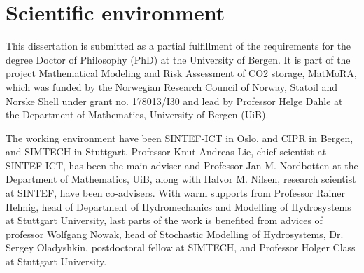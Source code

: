 \chapter{Scientific environment}

This dissertation is submitted as a partial fulfillment of the requirements for
the degree Doctor of Philosophy (PhD) at the University of Bergen. It is part
of the project Mathematical Modeling and Risk Assessment of CO2 storage,
MatMoRA, which was funded by the Norwegian Research Council of Norway, Statoil and Norske
Shell under grant no. 178013/I30 and lead by Professor Helge Dahle at the
Department of Mathematics, University of Bergen (UiB). 

The working environment have been SINTEF-ICT in Oslo, and CIPR in Bergen, and
SIMTECH in Stuttgart. Professor Knut-Andreas
Lie, chief scientist at SINTEF-ICT, has been the main adviser and Professor
Jan M. Nordbotten at the Department of Mathematics, UiB, along with  Halvor M. Nilsen, research
scientist at SINTEF, have been co-advisers. With warm
supports from Professor Rainer Helmig, head of Department of Hydromechanics and
Modelling of Hydrosystems at Stuttgart University, last parts of the work is
benefited from advices of professor Wolfgang Nowak, head of Stochastic Modelling
of Hydrosystems, Dr. Sergey Oladyshkin, postdoctoral fellow at SIMTECH,
and Professor Holger Class at Stuttgart University. 